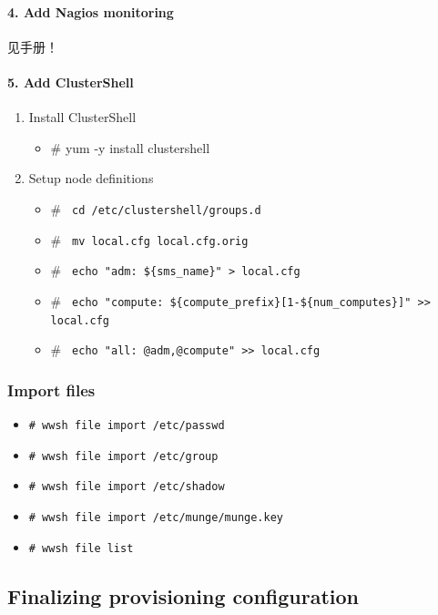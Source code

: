 {\paragraph{4. Add Nagios monitoring}
见手册！


\paragraph{5. Add ClusterShell}
\begin{enumerate}
\item Install ClusterShell
\begin{itemize}
\item \# yum -y install clustershell
\end{itemize}

\item Setup node definitions
\begin{itemize}
\item \# \verb| cd /etc/clustershell/groups.d |
\item \# \verb| mv local.cfg local.cfg.orig |
\item \# \verb| echo "adm: ${sms_name}" > local.cfg | 
\item \# \verb| echo "compute: ${compute_prefix}[1-${num_computes}]" >> local.cfg |
\item \# \verb| echo "all: @adm,@compute" >> local.cfg|
\end{itemize}
\end{enumerate}


\subsubsection{Import files}
\begin{itemize}
\item \verb|# wwsh file import /etc/passwd |
\item \verb|# wwsh file import /etc/group |
\item \verb|# wwsh file import /etc/shadow|
\item \verb|# wwsh file import /etc/munge/munge.key|
\item \verb|# wwsh file list|
\end{itemize}


\subsection{Finalizing provisioning configuration}
}
